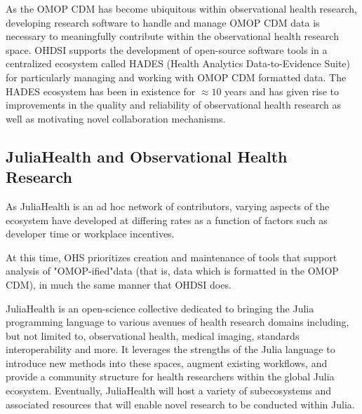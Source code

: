 \documentclass{juliacon}
\begin{document}
As the OMOP CDM has become ubiquitous within observational health research, developing research software to handle and manage OMOP CDM data is necessary to meaningfully contribute within the observational health research space.
OHDSI supports the development of open-source software tools in a centralized ecosystem called HADES (Health Analytics Data-to-Evidence Suite) for particularly managing and working with OMOP CDM formatted data.
The HADES ecosystem has been in existence for $\approx 10$ years and has given rise to improvements in the quality and reliability of observational health research as well as motivating novel collaboration mechanisms.

\subsection{JuliaHealth and Observational Health Research}

As JuliaHealth is an ad hoc network of contributors, varying aspects of the ecosystem have developed at differing rates as a function of factors such as developer time or workplace incentives.

At this time, OHS prioritizes creation and maintenance of tools that support analysis of "OMOP-ified"\footnotemark data (that is, data which is formatted in the OMOP CDM), in much the same manner that OHDSI does.


JuliaHealth is an open-science collective dedicated to bringing the Julia programming language to various avenues of health research domains including, but not limited to, observational health, medical imaging, standards interoperability and more.\cite{aluthgeAnnouncingJuliaHealthOrganization2020}
It leverages the strengths of the Julia language to introduce new methods into these spaces, augment existing workflows, and provide a community structure for health researchers within the global Julia ecosystem.
Eventually, JuliaHealth will host a variety of subecosystems and associated resources that will enable novel research to be conducted within Julia. 
\end{document}

